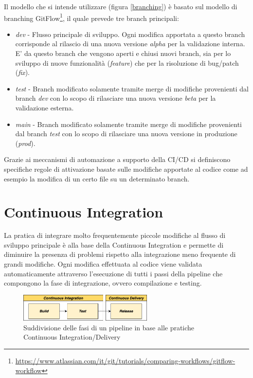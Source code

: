 Il modello che si intende utilizzare (figura \ref{branching}) è basato sul modello di branching GitFlow\footnote{\url{https://www.atlassian.com/it/git/tutorials/comparing-workflows/gitflow-workflow}}, il quale prevede tre branch principali:
\begin{itemize}
    \item \textit{dev} - Flusso principale di sviluppo. Ogni modifica apportata a questo branch corrisponde al rilascio di una nuova versione \textit{alpha} per la validazione interna. E' da questo branch che vengono aperti e chiusi nuovi branch, sia per lo sviluppo di nuove funzionalità (\textit{feature}) che per la risoluzione di bug/patch (\textit{fix}).
    \item \textit{test} - Branch modificato solamente tramite merge di modifiche provenienti dal branch \textit{dev} con lo scopo di rilasciare una nuova versione \textit{beta} per la validazione esterna.
    \item \textit{main} - Branch modificato solamente tramite merge di modifiche provenienti dal branch \textit{test} con lo scopo di rilasciare una nuova versione in produzione (\textit{prod}).
\end{itemize}

Grazie ai meccanismi di automazione a supporto della CI/CD si definiscono specifiche regole di attivazione basate sulle modifiche apportate al codice come ad esempio la modifica di un certo file su un determinato branch.

\section{Continuous Integration}
La pratica di integrare molto frequentemente piccole modifiche al flusso di sviluppo principale è alla base della Continuous Integration e permette di diminuire la presenza di problemi rispetto alla integrazione meno frequente di grandi modifiche. Ogni modifica effettuata al codice viene validata automaticamente attraverso l'esecuzione di tutti i passi della pipeline che compongono la fase di integrazione, ovvero compilazione e testing.

\begin{figure}[H]
\centering
\includegraphics[width=0.6\textwidth]{img/tesi-29-cicd.drawio.png}
\caption{Suddivisione delle fasi di un pipeline in base alle pratiche Continuous Integration/Delivery}
\end{figure}

